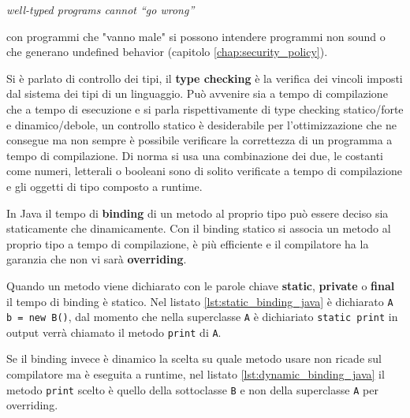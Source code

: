 \documentclass[Lau,binding=0.6cm]{sapthesis}
\newcommand{\textcode}[1]{\colorbox{backcolour}{\texttt{#1}}}
\begin{document}
\begin{center}
   \textit{well-typed programs cannot “go wrong”} ~\cite{milner:type_polymorphism}
\end{center}

con programmi che "vanno male" si possono intendere programmi non sound o che generano undefined behavior (capitolo \ref{chap:security_policy}).

Si è parlato di controllo dei tipi, il \textbf{type checking} è la verifica dei vincoli imposti dal sistema dei tipi di un linguaggio.
Può avvenire sia a tempo di compilazione che a tempo di esecuzione e si parla rispettivamente di type checking statico/forte e dinamico/debole, un controllo statico è desiderabile per l'ottimizzazione che ne consegue ma non sempre è possibile verificare la correttezza di un programma a tempo di compilazione.
Di norma si usa una combinazione dei due, le costanti come numeri, letterali o booleani sono di solito verificate a tempo di compilazione e gli oggetti di tipo composto a runtime. 

In Java il tempo di \textbf{binding} di un metodo al proprio tipo può essere deciso sia staticamente che dinamicamente.
Con il binding statico si associa un metodo al proprio tipo a tempo di compilazione, è più efficiente e il compilatore ha la garanzia che non vi sarà \textbf{overriding}. 

Quando un metodo viene dichiarato con le parole chiave \textbf{static}, \textbf{private} o \textbf{final} il tempo di binding è statico.
Nel listato \ref{lst:static_binding_java} è dichiarato \textcode{A b = new B()}, dal momento che nella superclasse \textcode{A} è dichiariato \textcode{static print} in output verrà chiamato il metodo \textcode{print} di \textcode{A}.

Se il binding invece è dinamico la scelta su quale metodo usare non ricade sul compilatore ma è eseguita a runtime, nel listato \ref{lst:dynamic_binding_java} il metodo \textcode{print} scelto è quello della sottoclasse \textcode{B} e non della superclasse \textcode{A} per overriding.






\end{document}
